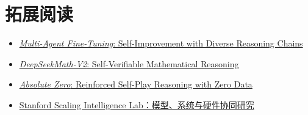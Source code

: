\section{拓展阅读}

\begin{itemize}
    \item \href{https://arxiv.org/search/?query=Multi-Agent+Fine-Tuning\&searchtype=all}{\emph{Multi-Agent Fine-Tuning}: Self-Improvement with Diverse Reasoning Chains}
    \item \href{https://arxiv.org/search/?query=DeepSeekMath-V2\&searchtype=all}{\emph{DeepSeekMath-V2}: Self-Verifiable Mathematical Reasoning}
    \item \href{https://arxiv.org/search/?query=Absolute+Zero+Reinforced+Self-play+Reasoning+with+Zero+Data\&searchtype=all}{\emph{Absolute Zero}: Reinforced Self-Play Reasoning with Zero Data}
    \item \href{https://scalingintelligence.stanford.edu/}{Stanford Scaling Intelligence Lab：模型、系统与硬件协同研究}
\end{itemize}

